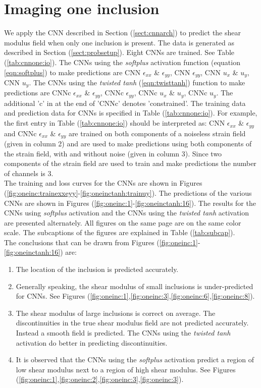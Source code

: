 \documentclass[12pt]{article}
\begin{document}
\section{\label{sect:oneinc}Imaging one inclusion}
We apply the CNN described in Section (\ref{sect:cnnarch}) to predict the shear modulus field when only one inclusion is present. The data is generated as described in Section (\ref{sect:probsetup}). Eight CNNs are trained. See Table (\ref{tab:cnnone:io}). The CNNs using the \textit{softplus} activation function (equation \ref{eqn:softplus}) to make predictions are CNN $\epsilon_{xx}$ \& $\epsilon_{yy}$, CNN $\epsilon_{yy}$, CNN $u_x$ \& $u_y$, CNN $u_y$. The CNNs using the \textit{twisted tanh} (\ref{eqn:twisttanh}) function to make predictions are CNNc $\epsilon_{xx}$ \& $\epsilon_{yy}$, CNNc $\epsilon_{yy}$, CNNc $u_x$ \& $u_y$, CNNc $u_y$. The additional 'c' in at the end of 'CNNc' denotes 'constrained'. The training data and prediction data for CNNs is specified in Table (\ref{tab:cnnone:io}). For example, the first entry in Table (\ref{tab:cnnone:io}) should be interpreted as: CNN $\epsilon_{xx}$ \& $\epsilon_{yy}$ and CNNc $\epsilon_{xx}$ \& $\epsilon_{yy}$ are trained on both components of a noiseless strain field (given in column 2) and are used to make predictions using both components of the strain field, with and without noise (given in column 3). Since two components of the strain field are used to train and make predictions the number of channels is $3$.\\
The training and loss curves for the CNNs are shown in Figures (\ref{fig:oneinc:trainexxeyy}-\ref{fig:oneinctanh:trainuy}). The predictions of the various CNNs are shown in Figures (\ref{fig:oneinc:1}-\ref{fig:oneinctanh:16}). The results for the CNNs using \textit{softplus} activation and the CNNs using the \textit{twisted tanh} activation are presented alternately. All figures on the same page are on the same color scale. The subcaptions of the figures are explained in Table (\ref{tab:subcap}).\\
The conclusions that can be drawn from Figures (\ref{fig:oneinc:1}-\ref{fig:oneinctanh:16}) are:
\begin{enumerate}
\item{The location of the inclusion is predicted accurately.}
\item{Generally speaking, the shear modulus of small inclusions is under-predicted for CNNs. See Figures (\ref{fig:oneinc:1},\ref{fig:oneinc:3},\ref{fig:oneinc:6},\ref{fig:oneinc:8}).}
\item{The shear modulus of large inclusions is correct on average. The discontinuities in the true shear modulus field are not predicted accurately. Instead a smooth field is predicted. The CNNs using the \textit{twisted tanh} activation do better in predicting discontinuities.}
\item{It is observed that the CNNs using the \textit{softplus} activation predict a region of low shear modulus next to a region of high shear modulus. See Figures (\ref{fig:oneinc:1},\ref{fig:oneinc:2},\ref{fig:oneinc:3},\ref{fig:oneinc:3}).}
\end{enumerate}
\end{document}
